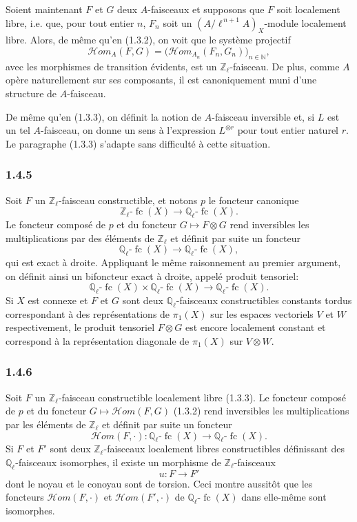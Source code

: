 \documentclass[11pt]{article}
\providecommand{\cHom}{\mathcal{H}om}
\providecommand{\fc}{\operatorname{fc}}
\begin{document}
Soient maintenant \(F\) et \(G\) deux \(A\)-faisceaux et supposons que \(F\) soit localement libre, i.e. que, pour tout entier \(n\), \(F_n\) soit un \((A/\ell^{\,n+1}A)_X\)-module localement libre. Alors, de même qu'en (1.3.2), on voit que le système projectif
\[
\cHom_A(F,G)=\bigl(\cHom_{A_n}(F_n,G_n)\bigr)_{n\in\mathbb N},
\]
avec les morphismes de transition évidents, est un \(\mathbb Z_\ell\)-faisceau. De plus, comme \(A\) opère naturellement sur ses composants, il est canoniquement muni d'une structure de \(A\)-faisceau.

De même qu'en (1.3.3), on définit la notion de \(A\)-faisceau inversible et, si \(L\) est un tel \(A\)-faisceau, on donne un sens à l'expression \(L^{\otimes r}\) pour tout entier naturel \(r\). Le paragraphe (1.3.3) s'adapte sans difficulté à cette situation.

\subsubsection*{1.4.5}
Soit \(F\) un \(\mathbb Z_\ell\)-faisceau constructible, et notons \(p\) le foncteur canonique
\[
\mathbb Z_\ell\text{-}\fc(X)\longrightarrow \mathbb Q_\ell\text{-}\fc(X).
\]
Le foncteur composé de \(p\) et du foncteur \(G\mapsto F\otimes G\) rend inversibles les multiplications par des éléments de \(\mathbb Z_\ell\) et définit par suite un foncteur
\[
\mathbb Q_\ell\text{-}\fc(X)\longrightarrow \mathbb Q_\ell\text{-}\fc(X),
\]
qui est exact à droite. Appliquant le même raisonnement au premier argument, on définit ainsi un bifoncteur exact à droite, appelé produit tensoriel:
\[
\mathbb Q_\ell\text{-}\fc(X)\times \mathbb Q_\ell\text{-}\fc(X)
\longrightarrow \mathbb Q_\ell\text{-}\fc(X).
\]
Si \(X\) est connexe et \(F\) et \(G\) sont deux \(\mathbb Q_\ell\)-faisceaux constructibles constants tordus correspondant à des représentations de \(\pi_1(X)\) sur les espaces vectoriels \(V\) et \(W\) respectivement, le produit tensoriel \(F\otimes G\) est encore localement constant et correspond à la représentation diagonale de \(\pi_1(X)\) sur \(V\otimes W\).

\subsubsection*{1.4.6}
Soit \(F\) un \(\mathbb Z_\ell\)-faisceau constructible localement libre (1.3.3). Le foncteur composé de \(p\) et du foncteur \(G\mapsto\cHom(F,G)\) (1.3.2) rend inversibles les multiplications par les éléments de \(\mathbb Z_\ell\) et définit par suite un foncteur
\[
\cHom(F,\cdot):\mathbb Q_\ell\text{-}\fc(X)\longrightarrow \mathbb Q_\ell\text{-}\fc(X).
\]
Si \(F\) et \(F'\) sont deux \(\mathbb Z_\ell\)-faisceaux localement libres constructibles définissant des \(\mathbb Q_\ell\)-faisceaux isomorphes, il existe un morphisme de \(\mathbb Z_\ell\)-faisceaux
\[
u:F\longrightarrow F'
\]
dont le noyau et le conoyau sont de torsion. Ceci montre aussitôt que les foncteurs \(\cHom(F,\cdot)\) et \(\cHom(F',\cdot)\) de \(\mathbb Q_\ell\text{-}\fc(X)\) dans elle-même sont isomorphes.
\end{document}
